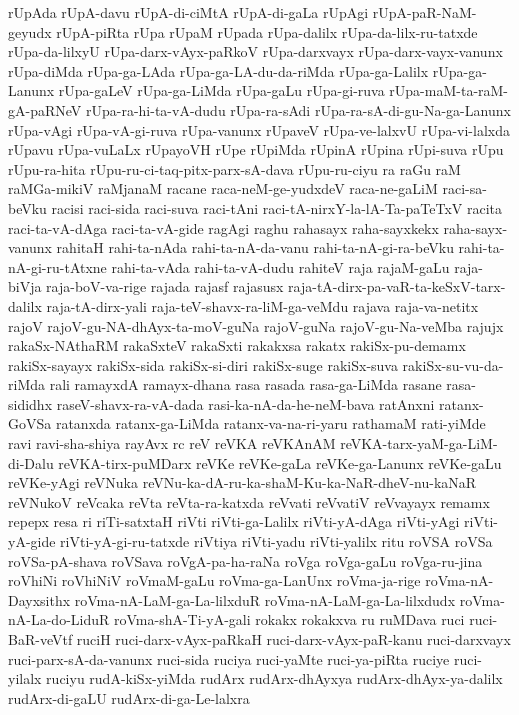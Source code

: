 {rUpAda
rUpA-davu
rUpA-di-ciMtA
rUpA-di-gaLa
rUpAgi
rUpA-paR-NaM-geyudx
rUpA-piRta
rUpa
rUpaM
rUpada
rUpa-dalilx
rUpa-da-lilx-ru-tatxde
rUpa-da-lilxyU
rUpa-darx-vAyx-paRkoV
rUpa-darxvayx
rUpa-darx-vayx-vanunx
rUpa-diMda
rUpa-ga-LAda
rUpa-ga-LA-du-da-riMda
rUpa-ga-Lalilx
rUpa-ga-Lanunx
rUpa-gaLeV
rUpa-ga-LiMda
rUpa-gaLu
rUpa-gi-ruva
rUpa-maM-ta-raM-gA-paRNeV
rUpa-ra-hi-ta-vA-dudu
rUpa-ra-sAdi
rUpa-ra-sA-di-gu-Na-ga-Lanunx
rUpa-vAgi
rUpa-vA-gi-ruva
rUpa-vanunx
rUpaveV
rUpa-ve-lalxvU
rUpa-vi-lalxda
rUpavu
rUpa-vuLaLx
rUpayoVH
rUpe
rUpiMda
rUpinA
rUpina
rUpi-suva
rUpu
rUpu-ra-hita
rUpu-ru-ci-taq-pitx-parx-sA-dava
rUpu-ru-ciyu
ra
raGu
raM
raMGa-mikiV
raMjanaM
racane
raca-neM-ge-yudxdeV
raca-ne-gaLiM
raci-sa-beVku
racisi
raci-sida
raci-suva
raci-tAni
raci-tA-nirxY-la-lA-Ta-paTeTxV
racita
raci-ta-vA-dAga
raci-ta-vA-gide
ragAgi
raghu
rahasayx
raha-sayxkekx
raha-sayx-vanunx
rahitaH
rahi-ta-nAda
rahi-ta-nA-da-vanu
rahi-ta-nA-gi-ra-beVku
rahi-ta-nA-gi-ru-tAtxne
rahi-ta-vAda
rahi-ta-vA-dudu
rahiteV
raja
rajaM-gaLu
raja-biVja
raja-boV-va-rige
rajada
rajasf
rajasusx
raja-tA-dirx-pa-vaR-ta-keSxV-tarx-dalilx
raja-tA-dirx-yali
raja-teV-shavx-ra-liM-ga-veMdu
rajava
raja-va-netitx
rajoV
rajoV-gu-NA-dhAyx-ta-moV-guNa
rajoV-guNa
rajoV-gu-Na-veMba
rajujx
rakaSx-NAthaRM
rakaSxteV
rakaSxti
rakakxsa
rakatx
rakiSx-pu-demamx
rakiSx-sayayx
rakiSx-sida
rakiSx-si-diri
rakiSx-suge
rakiSx-suva
rakiSx-su-vu-da-riMda
rali
ramayxdA
ramayx-dhana
rasa
rasada
rasa-ga-LiMda
rasane
rasa-sididhx
raseV-shavx-ra-vA-dada
rasi-ka-nA-da-he-neM-bava
ratAnxni
ratanx-GoVSa
ratanxda
ratanx-ga-LiMda
ratanx-va-na-ri-yaru
rathamaM
rati-yiMde
ravi
ravi-sha-shiya
rayAvx
rc
reV
reVKA
reVKAnAM
reVKA-tarx-yaM-ga-LiM-di-Dalu
reVKA-tirx-puMDarx
reVKe
reVKe-gaLa
reVKe-ga-Lanunx
reVKe-gaLu
reVKe-yAgi
reVNuka
reVNu-ka-dA-ru-ka-shaM-Ku-ka-NaR-dheV-nu-kaNaR
reVNukoV
reVcaka
reVta
reVta-ra-katxda
reVvati
reVvatiV
reVvayayx
remamx
repepx
resa
ri
riTi-satxtaH
riVti
riVti-ga-Lalilx
riVti-yA-dAga
riVti-yAgi
riVti-yA-gide
riVti-yA-gi-ru-tatxde
riVtiya
riVti-yadu
riVti-yalilx
ritu
roVSA
roVSa
roVSa-pA-shava
roVSava
roVgA-pa-ha-raNa
roVga
roVga-gaLu
roVga-ru-jina
roVhiNi
roVhiNiV
roVmaM-gaLu
roVma-ga-LanUnx
roVma-ja-rige
roVma-nA-Dayxsithx
roVma-nA-LaM-ga-La-lilxduR
roVma-nA-LaM-ga-La-lilxdudx
roVma-nA-La-do-LiduR
roVma-shA-Ti-yA-gali
rokakx
rokakxva
ru
ruMDava
ruci
ruci-BaR-veVtf
ruciH
ruci-darx-vAyx-paRkaH
ruci-darx-vAyx-paR-kanu
ruci-darxvayx
ruci-parx-sA-da-vanunx
ruci-sida
ruciya
ruci-yaMte
ruci-ya-piRta
ruciye
ruci-yilalx
ruciyu
rudA-kiSx-yiMda
rudArx
rudArx-dhAyxya
rudArx-dhAyx-ya-dalilx
rudArx-di-gaLU
rudArx-di-ga-Le-lalxra
}
